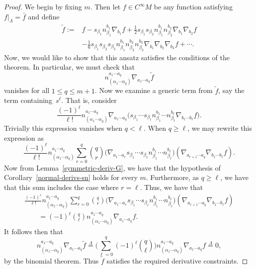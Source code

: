 \documentclass[10pt,a4paper]{article}
\numberwithin{equation}{section}
\renewcommand{\=}{\stackrel \Lambda =}
\begin{document}
\begin{proof}
We begin by fixing $m$. Then let $f \in C^\infty M$ be any function satisfying $f|_{\Lambda} = \bar{f}$ and define
\begin{align}
\tilde{f} :={}& f - s_{\beta_1} n^{b_1}_{\beta_1} \nabla_{b_1} f + \frac{1}{2} s_{\beta_1} s_{\beta_2} n^{b_1}_{\beta_1} n^{b_2}_{\beta_2} \nabla_{b_1} \nabla_{b_2} f\nonumber \\
&- \frac{1}{6} s_{\beta_1} s_{\beta_2} s_{\beta_3} n^{b_1}_{\beta_1} n^{b_2}_{\beta_2} n^{b_3}_{\beta_3} \nabla_{b_1} \nabla_{b_2} \nabla_{b_3} f + \cdots .\label{sym-ext}
\end{align}
Now, we would like to show that this ansatz satisfies the conditions of the theorem. In particular, we must check that
\[n^{a_1 \cdots a_q}_{(\alpha_1 \cdots \alpha_q)} \nabla_{a_1 \cdots a_q} \tilde{f} \]
vanishes for all $1 \leq q \leq m+1$. Now we examine a generic term from $\tilde{f}$, say the term containing~$s^{\ell}$. That is, consider
\[\frac{(-1)^{\ell}}{\ell!} n^{a_1 \cdots a_q}_{(\alpha_1 \cdots \alpha_q)} \nabla_{a_1 \cdots a_q} \bigl(s_{\beta_1} \cdots s_{\beta_{\ell}} n^{b_1}_{\beta_1} \cdots n^{b_\ell}_{\beta_{\ell}} \nabla_{b_1 \cdots b_{\ell}} f\bigr) .\]
Trivially this expression vanishes when $q < \ell$. When $q \geq \ell$, we may rewrite this expression as
\[\frac{(-1)^{\ell}}{\ell!} n^{a_1 \cdots a_q}_{(\alpha_1 \cdots \alpha_q)} \sum_{r=0}^{q} {q \choose r} \bigl(\nabla_{a_1 \cdots a_r} s_{\beta_1} \cdots s_{\beta_{\ell}} n^{b_1}_{\beta_1} \cdots n^{b_\ell}_{\beta_{\ell}}\bigr)(\nabla_{a_{r+1} \cdots a_{q}} \nabla_{b_1 \cdots b_{\ell}} f) .\]
Now from Lemma~\ref{symmetric-deriv-G}, we have that the hypothesis of Corollary~\ref{normal-derivs-sn} holds for every $m$. Furthermore, as $q \geq \ell$, we have that this sum includes the case where $r = \ell$. Thus, we have that
\begin{gather*}
\frac{(-1)^{\ell}}{\ell!} n^{a_1 \cdots a_q}_{(\alpha_1 \cdots \alpha_q)} \sum_{r=0}^{q} {q \choose r} \bigl(\nabla_{a_1 \cdots a_r} s_{\beta_1} \cdots s_{\beta_{\ell}} n^{b_1}_{\beta_1} \cdots n^{b_\ell}_{\beta_{\ell}}\bigr)(\nabla_{a_{r+1} \cdots a_{q}} \nabla_{b_1 \cdots b_{\ell}} f) \\
\qquad{}= (-1)^{\ell} {q \choose \ell} n^{a_1 \cdots a_q}_{(\alpha_1 \cdots \alpha_q)} \nabla_{a_1 \cdots a_q} f .
\end{gather*}
It follows then that
\[n^{a_1 \cdots a_q}_{(\alpha_1 \cdots \alpha_q)} \nabla_{a_1 \cdots a_q} \tilde{f} \= \Biggl(\sum_{\ell = 0}^q (-1)^{\ell} {q \choose \ell} \Biggr) n^{a_1 \cdots a_q}_{(\alpha_1 \cdots \alpha_q)} \nabla_{a_1 \cdots a_q} f \= 0 ,\]
by the binomial theorem. Thus $\tilde{f}$ satisfies the required derivative constraints.




\end{proof}
\end{document}
